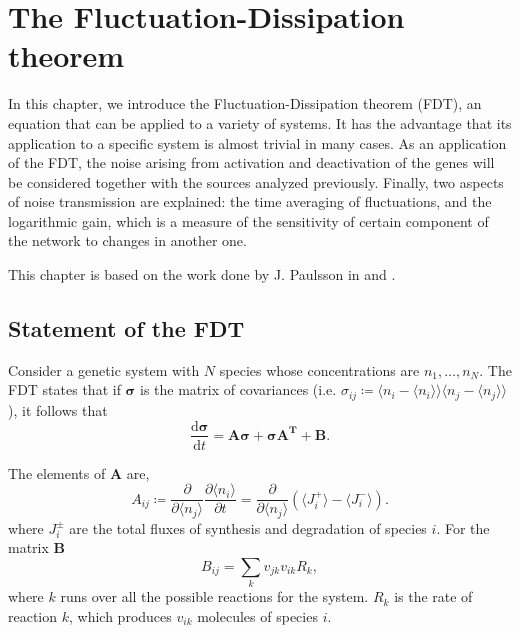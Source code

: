 \chapter{The Fluctuation-Dissipation theorem}
\label{ch:fdt}

In this chapter, we introduce the Fluctuation-Dissipation theorem (FDT), an equation that can be applied to a variety of systems. It has the advantage that its application to a specific system is almost trivial in many cases. As an application of the FDT, the noise arising from activation and deactivation of the genes will be considered together with the sources analyzed previously. Finally, two aspects of noise transmission are explained: the time averaging of fluctuations, and the logarithmic gain, which is a measure of the sensitivity of certain component of the network to changes in another one.

This chapter is based on the work done by J. Paulsson in \cite{paulsson04} and \cite{paulsson05}.

\section{Statement of the FDT}

Consider a genetic system with $N$ species whose concentrations are $n_1,\dotsc,n_N$. The FDT states that if $\mathbf{\sigma}$ is the matrix of covariances (i.e. $\sigma_{ij} \coloneqq \langle n_i-\langle n_i\rangle\rangle\langle n_j-\langle n_j\rangle\rangle$), it follows that 
\begin{equation*}
  \frac{\mathrm{d}\mathbf{\sigma}}{\mathrm{d}t} = \mathbf{A\sigma} + \mathbf{\sigma A^T}+\mathbf{B}.
\end{equation*}

The elements of $\mathbf{A}$ are,
\begin{equation}
  \label{eq:fdt-Adef}
  A_{ij} \coloneqq \frac{\partial}{\partial \langle n_j\rangle}\frac{\partial \langle n_i\rangle}{\partial t} = \frac{\partial}{\partial \langle n_j\rangle}\left(\langle J_i^+\rangle - \langle J_i^-\rangle\right).
\end{equation}
where $J_i^\pm$ are the total fluxes of synthesis and degradation of species $i$. For the matrix $\mathbf{B}$
\begin{equation}
  \label{eq:fdt-Bdef}
  B_{ij} = \sum_k v_{jk}v_{ik}R_k,
\end{equation}
where $k$ runs over all the possible reactions for the system. $R_k$ is the rate of reaction $k$, which produces $v_{ik}$ molecules of species $i$.

